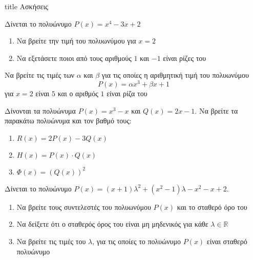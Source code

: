 \documentclass{../presentation}
\begin{document}
\begin{frame}[noframenumbering]
  \vfill
  \centering
  \begin{beamercolorbox}[sep=8pt,center,shadow=true,rounded=true]{title}
    Ασκήσεις
  \end{beamercolorbox}
  \vfill
\end{frame}

\begin{askisi}
  Δίνεται το πολυώνυμο $P(x)=x^4-3x+2$
  \begin{enumerate}
    \item<1-> Να βρείτε την τιμή του πολυωνύμου για $x=2$
    \item<2-> Να εξετάσετε ποιοι από τους αριθμούς $1$ και $-1$ είναι ρίζες του

  \end{enumerate}

\end{askisi}

\begin{askisi}
  Να βρείτε τις τιμές των $α$ και $β$ για τις οποίες η αριθμητική τιμή του πολυωνύμου
  $$P(x)=αx^3+βx+1$$
  για $x=2$ είναι $5$ και ο αριθμός $1$ είναι ρίζα του

\end{askisi}

\begin{askisi}
  Δίνονται τα πολυώνυμα $P(x)=x^3-x$ και $Q(x)=2x-1$. Να βρείτε τα παρακάτω πολυώνυμα και τον βαθμό τους:
  \begin{enumerate}
    \item<1-> $R(x)=2P(x)-3Q(x)$
    \item<2-> $H(x)=P(x)\cdot Q(x)$
    \item<3-> $Φ(x)=\left( Q(x) \right)^2 $
  \end{enumerate}

\end{askisi}

\begin{askisi}
  Δίνεται το πολυώνυμο $P(x)=(x+1)λ^2+(x^2-1)λ-x^2-x+2$.
  \begin{enumerate}
    \item<1-> Να βρείτε τους συντελεστές του πολυωνύμου $P(x)$ και το σταθερό όρο του
    \item<2-> Να δείξετε ότι ο σταθερός όρος του είναι μη μηδενικός για κάθε $λ\in\mathbb{R}$
    \item<3-> Να βρείτε τις τιμές του $λ$, για τις οποίες το πολυώνυμο $P(x)$ είναι σταθερό πολυώνυμο
  \end{enumerate}

\end{askisi}
\end{document}
